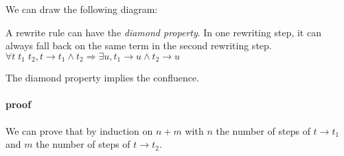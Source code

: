   We can draw the following diagram:

  \begin{center}
  \end{center}

  A rewrite rule can have the \textit{diamond property}. In one rewriting step,
  it can always fall back on the same term in the second rewriting step.
  $\forall t\; t_1\; t_2, t \to t_1 \wedge t_2 \Rightarrow \exists u, t_1 \to u
  \wedge t_2 \to u$

  \begin{center}
  \end{center}

  \lemma The diamond property implies the confluence.

  \paragraph{proof}
  We can prove that by induction
  on $n + m$ with $n$ the number of steps of $t \to t_1$ and $m$ the number of
  steps of $t \to t_2$.


